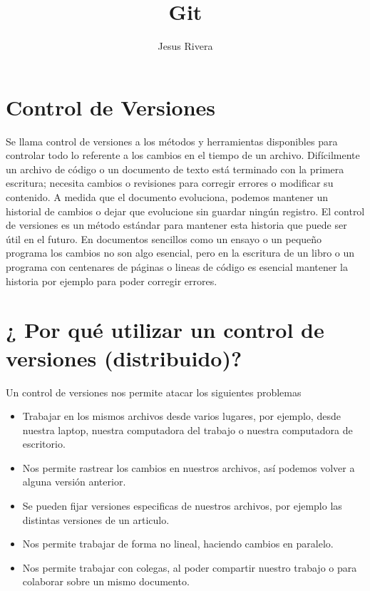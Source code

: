 \documentclass[12pt,a4paper]{article}
\author{Jesus Rivera}
\title{Git}
\begin{document}
\maketitle
\section*{Control de Versiones}
Se llama control de versiones a los métodos y herramientas disponibles para controlar todo lo referente a los cambios en el tiempo de un archivo. Difícilmente un archivo de código o un documento de texto está terminado con la primera escritura; necesita cambios o revisiones para corregir errores o modificar su contenido. A medida que el
documento evoluciona, podemos mantener un historial de cambios o dejar que evolucione sin
guardar ningún registro. El control de versiones es un método estándar para mantener esta historia que puede ser útil en el futuro.
En documentos sencillos como un ensayo o un pequeño programa los cambios no son algo esencial, pero en la escritura de un libro o un programa con centenares de páginas o lineas de código es esencial mantener la historia por ejemplo para poder corregir errores. 

\section*{¿ Por qué utilizar un control de versiones (distribuido)?}
Un control de versiones nos permite atacar los siguientes problemas
\begin{itemize}
\item Trabajar en los mismos archivos desde varios lugares, por ejemplo, desde nuestra laptop, nuestra computadora del trabajo o nuestra computadora de escritorio.
\item  Nos permite rastrear los cambios en nuestros archivos, así podemos volver a alguna versión anterior.

\item Se pueden fijar versiones especificas de nuestros archivos, por ejemplo las distintas versiones de un articulo.

\item Nos permite trabajar de forma no lineal, haciendo cambios en paralelo.

\item Nos permite trabajar con colegas, al poder compartir nuestro trabajo o para colaborar sobre un mismo documento.

\end{itemize}
\end{document}
